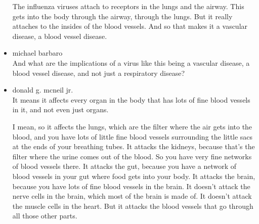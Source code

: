 \begin{itemize}
  The influenza viruses attach to receptors in the lungs and the airway.
  This gets into the body through the airway, through the lungs. But it
  really attaches to the insides of the blood vessels. And so that makes
  it a vascular disease, a blood vessel disease.
\item
  michael barbaro\\
  And what are the implications of a virus like this being a vascular
  disease, a blood vessel disease, and not just a respiratory disease?
\item
  donald g. mcneil jr.\\
  It means it affects every organ in the body that has lots of fine
  blood vessels in it, and not even just organs.

  I mean, so it affects the lungs, which are the filter where the air
  gets into the blood, and you have lots of little fine blood vessels
  surrounding the little sacs at the ends of your breathing tubes. It
  attacks the kidneys, because that's the filter where the urine comes
  out of the blood. So you have very fine networks of blood vessels
  there. It attacks the gut, because you have a network of blood vessels
  in your gut where food gets into your body. It attacks the brain,
  because you have lots of fine blood vessels in the brain. It doesn't
  attack the nerve cells in the brain, which most of the brain is made
  of. It doesn't attack the muscle cells in the heart. But it attacks
  the blood vessels that go through all those other parts.


\end{itemize}
